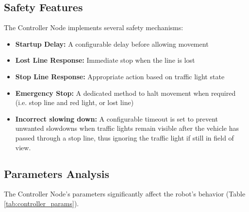 \documentclass[9pt,technote]{IEEEtran}
\begin{document}
\subsection{Safety Features}
The Controller Node implements several safety mechanisms:

\begin{itemize}
    \item \textbf{Startup Delay:} A configurable delay before allowing movement
    \item \textbf{Lost Line Response:} Immediate stop when the line is lost
    \item \textbf{Stop Line Response:} Appropriate action based on traffic light state
    \item \textbf{Emergency Stop:} A dedicated method to halt movement when required (i.e. stop line and red light, or lost line)
    \item \textbf{Incorrect slowing down:} A configurable timeout is set to prevent unwanted slowdowns when traffic lights remain visible after the vehicle has passed through a stop line, thus ignoring the traffic light if still in field of view.
\end{itemize}

\subsection{Parameters Analysis}
The Controller Node's parameters significantly affect the robot's behavior (Table \ref{tab:controller_params}).
\end{document}
